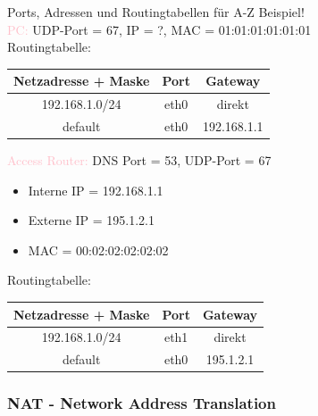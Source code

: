 \begin{example2}{Ports{,} Adressen und Routingtabellen} für A-Z Beispiel!\\
    \textcolor{pink}{PC:} UDP-Port = 67, IP = ?, MAC = 01:01:01:01:01:01\\
    Routingtabelle:\\
    \begin{tabular}{|c|c|c|}
        \hline
        Netzadresse + Maske & Port & Gateway\\
        \hline
        192.168.1.0/24 & eth0 & direkt\\
        \hline
        default & eth0 & 192.168.1.1\\
        \hline
    \end{tabular}

    \vspace{2mm}

    \textcolor{pink}{Access Router:} DNS Port = 53, UDP-Port = 67
    \begin{itemize}
        \item Interne IP = 192.168.1.1
        \item Externe IP = 195.1.2.1
        \item MAC = 00:02:02:02:02:02
    \end{itemize}
    Routingtabelle:\\
    \begin{tabular}{|c|c|c|}
        \hline
        Netzadresse + Maske & Port & Gateway\\
        \hline
        192.168.1.0/24 & eth1 & direkt\\
        \hline
        default & eth0 & 195.1.2.1\\
        \hline
    \end{tabular}

\end{example2}
\subsubsection{NAT - Network Address Translation}

